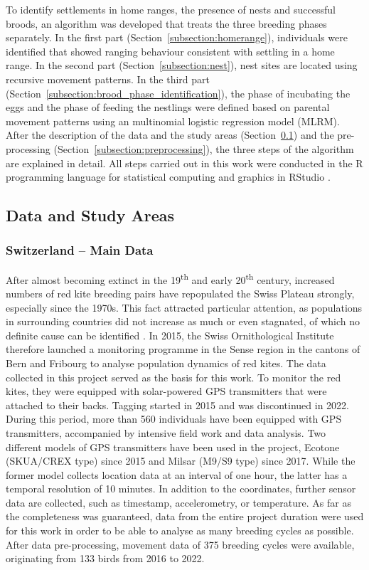 To identify settlements in home ranges, the presence of nests and successful broods, an algorithm was developed that treats the three breeding phases separately. In the first part (Section~\ref{subsection:homerange}), individuals were identified that showed ranging behaviour consistent with settling in a home range. In the second part (Section~\ref{subsection:nest}), nest sites are located using recursive movement patterns. In the third part (Section~\ref{subsection:brood_phase_identification}), the phase of incubating the eggs and the phase of feeding the nestlings were defined based on parental movement patterns using an multinomial logistic regression model (MLRM). After the description of the data and the study areas (Section~\ref{subsection:data_study_areas}) and the pre-processing (Section~\ref{subsection:preprocessing}), the three steps of the algorithm are explained in detail. All steps carried out in this work were conducted in the R programming language for statistical computing and graphics in RStudio \parencite{rstudio}.



\subsection{Data and Study Areas}  \label{subsection:data_study_areas}
\subsubsection{Switzerland -- Main Data}
After almost becoming extinct in the 19\textsuperscript{th} and early 20\textsuperscript{th} century, increased numbers of red kite breeding pairs have repopulated the Swiss Plateau strongly, especially since the 1970s. This fact attracted particular attention, as populations in surrounding countries did not increase as much or even stagnated, of which no definite cause can be identified \parencite{swissornithologicalinstitute}. In 2015, the Swiss Ornithological Institute therefore launched a monitoring programme in the Sense region in the cantons of Bern and Fribourg to analyse population dynamics of red kites. The data collected in this project served as the basis for this work. To monitor the red kites, they were equipped with solar-powered GPS transmitters that were attached to their backs. Tagging started in 2015 and was discontinued in 2022. During this period, more than 560 individuals have been equipped with GPS transmitters, accompanied by intensive field work and data analysis. Two different models of GPS transmitters have been used in the project, Ecotone (SKUA/CREX type) since 2015 and Milsar (M9/S9 type) since 2017. While the former model collects location data at an interval of one hour, the latter has a temporal resolution of 10 minutes. In addition to the coordinates, further sensor data are collected, such as timestamp, accelerometry, or temperature. As far as the completeness was guaranteed, data from the entire project duration were used for this work in order to be able to analyse as many breeding cycles as possible. After data pre-processing, movement data of 375 breeding cycles were available, originating from 133 birds from 2016 to 2022.

